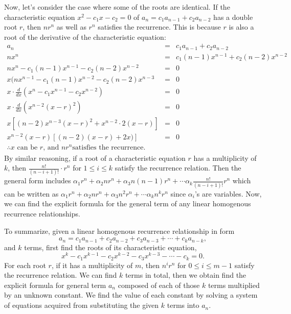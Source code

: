 \documentclass[12pt, oneside]{article}
\begin{document}
Now, let's consider the case where some of the roots are identical. If the characteristic equation $x^2 - c_1x - c_2 = 0$ of $a_n = c_1a_{n-1} + c_2a_{n-2}$ has a double root $r$, then $nr^n$ as well as $r^n$ satisfies the recurrence. This is because $r$ is also a root of the derivative of the characteristic equation:
\begin{eqnarray*}
a_n &=& c_1a_{n-1} + c_2a_{n-2}\\
nx^n &=& c_1(n-1)x^{n-1} + c_2(n-2)x^{n-2}\\
nx^n - c_1(n-1)x^{n-1} - c_2(n-2)x^{n-2} &=& 0\\
x(nx^{n-1} - c_1(n-1)x^{n-2} - c_2(n-2)x^{n-3} &=& 0\\
x \cdot \frac{d}{dx}\left(x^n - c_1x^{n-1} - c_2x^{n-2}\right) &=& 0\\
x \cdot \frac{d}{dx}\left(x^{n-2}(x-r)^2\right) &=& 0\\
x [(n-2)x^{n-3}(x-r)^2 + x^{n-2}\cdot 2(x-r)] &=& 0\\
x^{n-2}(x-r)[(n-2)(x-r) + 2x)] &=& 0\\
\therefore x \text{ can be } r \text{, and } nr^n \text{satisfies the recurrence.}
\end{eqnarray*}
By similar reasoning, if a root of a characteristic equation $r$ has a multiplicity of $k$, then $\displaystyle \frac{n!}{(n-i+1)!} \cdot r^n$ for $1 \leq i \leq k$ satisfy the recurrence relation. Then the general form includes $\alpha_1 r^n + \alpha_2 nr^n + \alpha_3 n(n-1)r^n + \cdots \alpha_k\frac{n!}{(n-i+1)!}r^n$ which can be written as $\alpha_1 r^n + \alpha_2 nr^n + \alpha_3 n^2r^n + \cdots \alpha_kn^kr^n$ since $\alpha_i$'s are variables. Now, we can find the explicit formula for the general term of any linear homogenous recurrence relationships.

To summarize, given a linear homogenous recurrence relationship in form
\[a_n = c_1a_{n-1} +  c_2a_{n-2} + c_3a_{n-3} + \cdots + c_ka_{n-k},\]
and $k$ terms, first find the roots of its characteristic equation,
\[x^k - c_1x^{k-1} - c_2x^{k-2} - c_3x^{k-3} - \cdots - c_k = 0.\]
For each root $r$, if it has a multiplicity of $m$, then $n^ir^n$ for $0 \leq i \leq m - 1$ satisfy the recurrence relation. We can find $k$ terms in total, then we obtain find the explicit formula for general term $a_n$ composed of each of those $k$ terms multiplied by an unknown constant. We find the value of each constant by solving a system of equations acquired from substituting the given $k$ terms into $a_n$.
\end{document}
